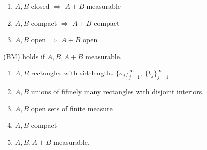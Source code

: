 \begin{enumerate}
	\item $A,B$ closed $⇒$ $A+B$ measurable
	\item $A,B$ compact $⇒$ $A+B$ compact
	\item $A,B$ open $⇒$ $A+B$ open
\end{enumerate}
\begin{theo} (BM) holds if $A,B,A+B$ measurable.
\end{theo}
\begin{enumerate}
	\item $A,B$ rectangles with sidelengths $\{a_j\}_{j=1}^∞,\ \{b_j\}_{j=1}^∞$
	\item $A,B$ unions of fifinely many rectangles with disjoint interiors.
	\item $A,B$ open sets of finite measure
	\item $A,B$ compact
	\item $A,B,A+B$ measurable.
\end{enumerate}
